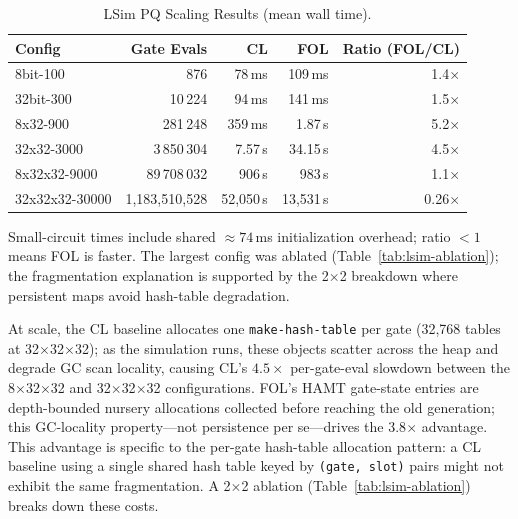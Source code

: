 \documentclass[sigconf,nonacm]{acmart}
\begin{document}
\begin{table}[htbp]
\small
\caption{LSim PQ Scaling Results (mean wall time).}
\label{tab:lsim-perf}
\begin{threeparttable}
\begin{tabular}{lrrrr}
\toprule
\textbf{Config} & \textbf{Gate Evals} & \textbf{CL} & \textbf{FOL} & \textbf{Ratio (FOL/CL)} \\
\midrule
8bit-100        &           876 &   78\,ms &  109\,ms & 1.4$\times$ \\
32bit-300       &        10\,224 &  94\,ms &   141\,ms & 1.5$\times$ \\
8x32-900         &       281\,248 &   359\,ms &   1.87\,s & 5.2$\times$ \\
32x32-3000      &     3\,850\,304 &   7.57\,s &  34.15\,s  & 4.5$\times$ \\
8x32x32-9000    &    89\,708\,032 &   906\,s  &   983\,s  & 1.1$\times$ \\
32x32x32-30000  & 1,183,510,528 & 52,050\,s & 13,531\,s & 0.26$\times$\tnote{a} \\
\bottomrule
\end{tabular}
\begin{tablenotes}
  \footnotesize
  \item[a] Small-circuit times include shared ${\approx}74$\,ms initialization overhead; ratio $<1$ means FOL is faster.
        The largest config was ablated (Table~\ref{tab:lsim-ablation}); the fragmentation explanation is supported by the 2$\times$2 breakdown where persistent maps avoid hash-table degradation.
\end{tablenotes}
\end{threeparttable}
\end{table}

At scale, the CL baseline allocates one \texttt{make-hash-table} per gate (32,768 tables at 32$\times$32$\times$32); as the simulation runs,
these objects scatter across the heap and degrade GC scan locality, causing CL's $4.5{\times}$ per-gate-eval slowdown between the 8$\times$32$\times$32 and 32$\times$32$\times$32 configurations.
FOL's HAMT gate-state entries are depth-bounded nursery allocations collected before reaching the old generation; this GC-locality property---not persistence per se---drives the 3.8$\times$ advantage.
This advantage is specific to the per-gate hash-table allocation pattern: a CL baseline using a single shared hash table keyed by \texttt{(gate, slot)} pairs might not exhibit the same fragmentation.
A 2$\times$2 ablation (Table~\ref{tab:lsim-ablation}) breaks down these costs.
\end{document}
